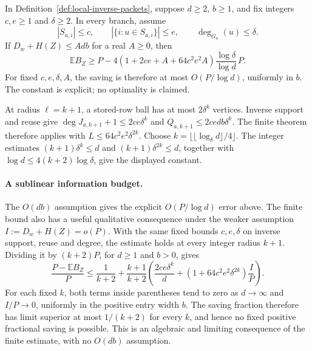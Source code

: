 \begin{corollary}\label{cor:local-robust-degree}
In Definition~\ref{def:local-inverse-packets}, suppose $d\ge2$, $b\ge1$,
and fix integers $c,e\ge1$ and $\delta\ge2$. In every branch, assume
\[
 |S_{a,i}|\le c,\qquad
 |\{i:u\in S_{a,i}\}|\le e,\qquad
 \deg_{G_a}(u)\le\delta.
\]
If $D_w+H(Z)\le A db$ for a real $A\ge0$, then
\[
 \mathbb E B_Z\ge P-
  4(1+2ce+A+64c^2e^2A)\frac{\log\delta}{\log d}\,P.
\]
For fixed $c,e,\delta,A$, the saving is therefore at most $O(P/\log d)$,
uniformly in $b$. The constant is explicit; no optimality is claimed.
\end{corollary}
\begin{proofoutline}
At radius $\ell=k+1$, a stored-row ball has at most $2\delta^k$ vertices.
Inverse support and reuse give
$\deg J_{a,k+1}+1\le2ce\delta^k$ and
$Q_{a,k+1}\le2cedb\delta^k$. The finite theorem therefore applies with
$L\le64c^2e^2\delta^{2k}$. Choose
$k=\lfloor\lfloor\log_\delta d\rfloor/4\rfloor$.
The integer estimates $(k+1)\delta^k\le d$ and
$(k+1)\delta^{2k}\le d$, together with
$\log d\le4(k+2)\log\delta$, give the displayed constant.
\end{proofoutline}

\paragraph{A sublinear information budget.}
The $O(db)$ assumption gives the explicit $O(P/\log d)$ error above.
The finite bound also has a useful qualitative consequence under the weaker
assumption $I:=D_w+H(Z)=o(P)$. With the same fixed bounds $c,e,\delta$ on
inverse support, reuse and degree, the estimate holds at every integer
radius $k+1$. Dividing it by $(k+2)P$, for $d\ge1$ and $b>0$, gives
\[
 \frac{P-\mathbb E B_Z}{P}
 \le \frac1{k+2}+\frac{k+1}{k+2}
 \left(\frac{2ce\delta^k}{d}
       +(1+64c^2e^2\delta^{2k})\frac I P\right).
\]
For each fixed $k$, both terms inside parentheses tend to zero as
$d\to\infty$ and $I/P\to0$, uniformly in the positive entry width $b$.
The saving fraction therefore has limit superior at most
$1/(k+2)$ for every $k$, and hence no fixed positive fractional saving is
possible. This is an algebraic and limiting consequence of the finite
estimate, with no $O(db)$ assumption.

